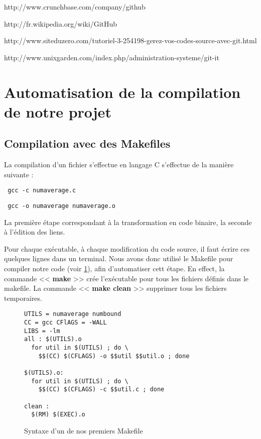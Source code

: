 http://www.crunchbase.com/company/github

http://fr.wikipedia.org/wiki/GitHub

http://www.siteduzero.com/tutoriel-3-254198-gerez-vos-codes-source-avec-git.html

http://www.unixgarden.com/index.php/administration-systeme/git-it


\section{Automatisation de la compilation de notre projet}
\subsection{Compilation avec des Makefiles}

La compilation d'un fichier s'effectue en langage C s'effectue de la mani\`ere suivante :
\begin{verbatim} gcc -c numaverage.c\end{verbatim}
\begin{verbatim} gcc -o numaverage numaverage.o\end{verbatim}

La premi\`ere \'etape correspondant \`a la transformation en code binaire, la seconde \`a l'\'edition des liens.

Pour chaque ex\'ecutable, \`a chaque modification du code source, il faut \'ecrire ces quelques lignes dans un terminal.
Nous avons donc utilis\'e le Makefile pour compiler notre code (voir \ref{fig:exemple_makefile}), afin d'automatiser cett \'etape.
En effect, la commande << \textbf{make} >> cr\'ee l'ex\'ecutable pour tous les fichiers d\'efinis dans le makefile. La commande
<< \textbf{make clean} >> supprimer tous les fichiers temporaires.
\newline
\begin{figure}[h] 
\begin{center}

\begin{minipage}[|c|]{0.7\linewidth}
\begin{verbatim}
UTILS = numaverage numbound
CC = gcc CFlAGS = -WALL
LIBS = -lm
all : $(UTILS).o
  for util in $(UTILS) ; do \
    $$(CC) $(CFLAGS) -o $$util $$util.o ; done

$(UTILS).o:
  for util in $(UTILS) ; do \
    $$(CC) $(CFLAGS) -c $$util.c ; done

clean :
  $(RM) $(EXEC).o

\end{verbatim}
\end{minipage}
\end{center}
\caption{Syntaxe d'un de nos premiers Makefile}
\label{fig:exemple_makefile}
\end{figure}

